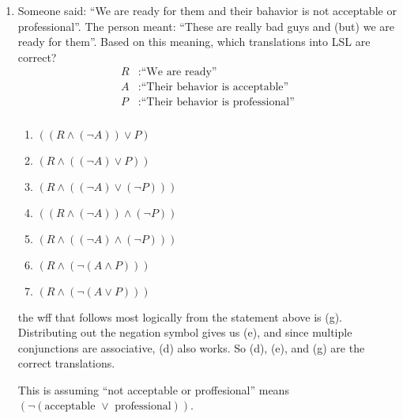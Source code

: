 \documentclass[11pt]{article}
\begin{document}
\begin{enumerate}
    \item Someone said: ``We are ready for them and their bahavior is not acceptable or professional''.  The person meant: ``These are really bad guys and (but) we are ready for them''.  Based on this meaning, which translations into LSL are correct?
      \begin{align*}
        R &: \text{``We are ready''} \\
        A &: \text{``Their behavior is acceptable''} \\
        P &: \text{``Their behavior is professional''} \\
      \end{align*}
      \begin{center}
        \begin{minipage}[c]{0.5\linewidth}
          \begin{enumerate}[label=(\alph*)]
            \item \(((R \wedge (\neg A)) \vee P)\)
            \item \((R \wedge ((\neg A) \vee P))\)
            \item \((R \wedge ((\neg A) \vee (\neg P)))\)
            \item \(((R \wedge (\neg A)) \wedge (\neg P))\)
            \item \((R \wedge ((\neg A) \wedge (\neg P)))\)
            \item \((R \wedge (\neg (A \wedge P)))\)
            \item \((R \wedge (\neg (A \vee P)))\)
          \end{enumerate}
        \end{minipage}
      \end{center}
      the wff that follows most logically from the statement above is (g).  Distributing out the negation symbol gives us (e), and since multiple conjunctions are associative, (d) also works.  So (d), (e), and (g) are the correct translations.

      This is assuming ``not acceptable or proffesional'' means \((\neg(\text{acceptable } \vee \text{ professional}))\).

  \end{enumerate}
\end{document}
